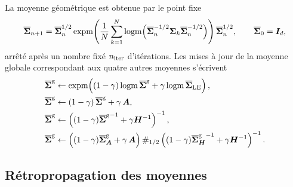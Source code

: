La moyenne géométrique est obtenue par le point fixe 
\begin{equation}
  \overline{\boldsymbol{\Sigma}}_{n+1}
  =
  \overline{\boldsymbol{\Sigma}}_{n}^{1/2}
  \operatorname{\operatorname{expm}}\!\left(\frac{1}{N}\sum_{k=1}^{N}
    \operatorname{\operatorname{logm}}\!\left(\overline{\boldsymbol{\Sigma}}_{n}^{-1/2}\boldsymbol{\Sigma}_k\overline{\boldsymbol{\Sigma}}_{n}^{-1/2}\right)\right)
  \overline{\boldsymbol{\Sigma}}_{n}^{1/2},
  \qquad \overline{\boldsymbol{\Sigma}}_0=\boldsymbol{I}_{d},
  \label{eq:spdnet-geometrique-iteration}
\end{equation}
arrêté après un nombre fixé $n_{\mathrm{iter}}$ d'itérations. Les mises à jour de la
moyenne globale correspondant aux quatre autres moyennes s'écrivent
\begin{align}
  \overline{\boldsymbol{\Sigma}}^{\mathrm{g}} &\gets \operatorname{\operatorname{expm}}\!\left((1-\gamma)\operatorname{\operatorname{logm}}\overline{\boldsymbol{\Sigma}}^{\mathrm{g}}+\gamma\operatorname{\operatorname{logm}}\overline{\boldsymbol{\Sigma}}_{\mathrm{LE}}\right),
  \label{eq:spdnet-momentum-le}\\
  \overline{\boldsymbol{\Sigma}}^{\mathrm{g}} &\gets (1-\gamma)\,\overline{\boldsymbol{\Sigma}}^{\mathrm{g}}+\gamma\,\boldsymbol{A},
  \label{eq:spdnet-momentum-ari}\\
  \overline{\boldsymbol{\Sigma}}^{\mathrm{g}} &\gets \left((1-\gamma){\overline{\boldsymbol{\Sigma}}^{\mathrm{g}}}^{-1}+\gamma{\boldsymbol{H}}^{-1}\right)^{-1},
  \label{eq:spdnet-momentum-harm}\\
  \overline{\boldsymbol{\Sigma}}^{\mathrm{g}} &\gets \left((1-\gamma)\overline{\boldsymbol{\Sigma}}^{\mathrm{g}}_{\boldsymbol{A}}+\gamma\,\boldsymbol{A}\right)
    \#_{1/2}
    \left((1-\gamma){\overline{\boldsymbol{\Sigma}}^{\mathrm{g}}_{\boldsymbol{H}}}^{-1}+\gamma{\boldsymbol{H}}^{-1}\right)^{-1}.
  \label{eq:spdnet-momentum-gah}
\end{align}


\subsection{Rétropropagation des moyennes}
\label{sec:spdnet-batchnorm-gradmoyennes}

